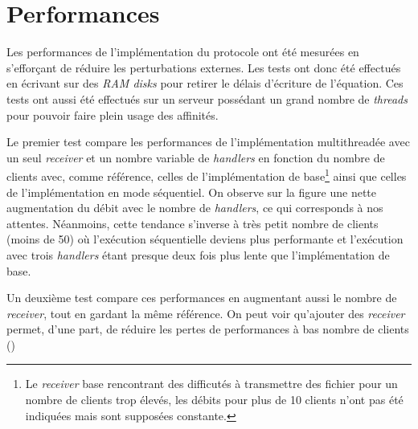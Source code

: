 \documentclass[../main.tex]{subfiles}
\begin{document}
\section{Performances}
\label{sec:performances}

Les performances de l'implémentation du protocole ont été mesurées en s'efforçant de réduire les perturbations externes. Les tests ont donc été 
effectués en écrivant sur des \textit{RAM disks} pour retirer le délais d'écriture de l'équation. Ces tests ont aussi été effectués sur un serveur 
possédant un grand nombre de \textit{threads} pour pouvoir faire plein usage des affinités.

Le premier test compare les performances de l'implémentation multithreadée avec un seul \textit{receiver} et un nombre variable de \textit{handlers}  %
en fonction du nombre de clients avec, comme référence, celles de l'implémentation de base\footnote{Le \textit{receiver} base rencontrant des 
difficutés à transmettre des fichier pour un nombre de clients trop élevés, les débits pour plus de 10 clients n'ont pas été indiquées mais sont 
supposées constante.} ainsi que celles de l'implémentation en mode séquentiel.          %
On observe sur la figure une nette augmentation du débit avec le nombre de \textit{handlers}, ce qui corresponds à nos attentes. Néanmoins, cette 
tendance s'inverse à très petit nombre de clients (moins de 50) où l'exécution séquentielle deviens plus performante et l'exécution avec trois \textit{handlers} étant 
presque deux fois plus lente que l'implémentation de base.

Un deuxième test compare ces performances en augmentant aussi le nombre de \textit{receiver}, tout en gardant la même référence. On peut voir qu'ajouter 
des \textit{receiver} permet, d'une part, de réduire les pertes de performances à bas nombre de clients ()
\end{document}
